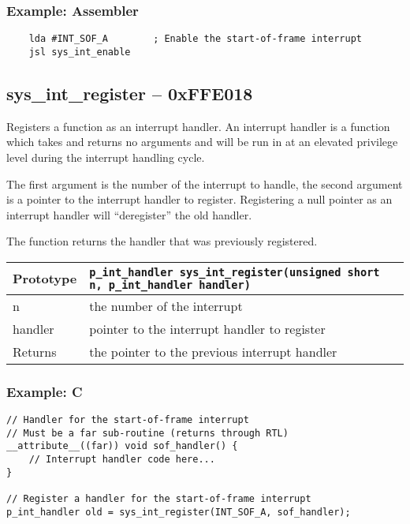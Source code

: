 \subsubsection*{Example: Assembler}
\begin{verbatim}
    lda #INT_SOF_A        ; Enable the start-of-frame interrupt
    jsl sys_int_enable
\end{verbatim}

\subsection*{sys\_int\_register -- 0xFFE018}
Registers a function as an interrupt handler. An interrupt handler is a function which takes and returns no arguments and will be run in at an elevated privilege level during the interrupt handling cycle.

The first argument is the number of the interrupt to handle, the second argument is a pointer to the interrupt handler to register. Registering a null pointer as an interrupt handler will ``deregister'' the old handler.

The function returns the handler that was previously registered.

\begin{tabular}{|l||l|} \hline
Prototype & \lstinline!p_int_handler sys_int_register(unsigned short n, p_int_handler handler)! \\ \hline
n & the number of the interrupt \\ \hline
handler & pointer to the interrupt handler to register \\ \hline
Returns & the pointer to the previous interrupt handler \\ \hline
\end{tabular}

\subsubsection*{Example: C}
\begin{lstlisting}
// Handler for the start-of-frame interrupt
// Must be a far sub-routine (returns through RTL)
__attribute__((far)) void sof_handler() {
	// Interrupt handler code here...
}

// Register a handler for the start-of-frame interrupt
p_int_handler old = sys_int_register(INT_SOF_A, sof_handler);
\end{lstlisting}

